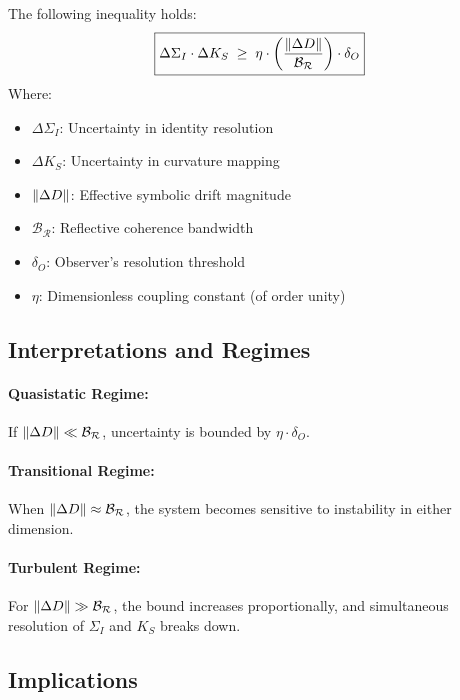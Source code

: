 \begin{theorem}
\label{theorem:bk7_pisu}
The following inequality holds:
\begin{equation}
\boxed{\Delta\Sigma_I \cdot \Delta K_S \;\geq\; \eta \cdot \left(\frac{\|\Delta D\|}{\mathcal{B_R}}\right) \cdot \delta_O}
\end{equation}
Where:
\begin{itemize}
    \item $\Delta\Sigma_I$: Uncertainty in identity resolution
    \item $\Delta K_S$: Uncertainty in curvature mapping
    \item $\|\Delta D\|$: Effective symbolic drift magnitude
    \item $\mathcal{B_R}$: Reflective coherence bandwidth
    \item $\delta_O$: Observer's resolution threshold
    \item $\eta$: Dimensionless coupling constant (of order unity)
\end{itemize}
\end{theorem}

\subsection{Interpretations and Regimes}
\label{subsec:bk7_pisu_regimes}

\paragraph{Quasistatic Regime:} If $\|\Delta D\| \ll \mathcal{B_R}$, uncertainty is bounded by $\eta \cdot \delta_O$.

\paragraph{Transitional Regime:} When $\|\Delta D\| \approx \mathcal{B_R}$, the system becomes sensitive to instability in either dimension.

\paragraph{Turbulent Regime:} For $\|\Delta D\| \gg \mathcal{B_R}$, the bound increases proportionally, and simultaneous resolution of $\Sigma_I$ and $K_S$ breaks down.

\subsection{Implications}
\label{subsec:bk7_pisu_implications}

